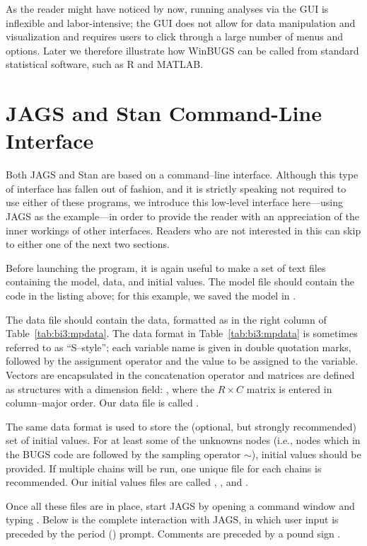 As the reader might have noticed by now, running analyses via the GUI is inflexible and labor-intensive; the GUI does not allow for data manipulation and visualization and requires users to click through a large number of menus and options. Later we therefore illustrate how WinBUGS can be called from standard statistical software, such as R and MATLAB.


\section{JAGS and Stan Command-Line Interface}
Both JAGS and Stan are based on a command--line interface. Although this type of interface has fallen out of fashion, and it is strictly speaking not required to use either of these programs, we introduce this low-level interface here---using JAGS as the example---in order to provide the reader with an appreciation of the inner workings of other interfaces. Readers who are not interested in this can skip to either one of the next two sections.

Before launching the program, it is again useful to make a set of text files containing the model, data, and initial values. The model file should contain the code in the listing above; for this example, we saved the model in . 

The data file should contain the data, formatted as in the right column of Table~\ref{tab:bi3:mpdata}. The data format in Table~\ref{tab:bi3:mpdata} is sometimes referred to as ``S--style''; each variable name is given in double quotation marks, followed by the assignment operator \code{<-} and the value to be assigned to the variable. Vectors are encapsulated in the concatenation operator  and matrices are defined as structures with a dimension field: , where the $R \times C$ matrix is entered in column--major order. Our data file is called .

The same data format is used to store the (optional, but strongly recommended) set of initial values. For at least some of the unknowns nodes (i.e., nodes which in the BUGS code are followed by the sampling operator $\sim$), initial values should be provided. If multiple chains will be run, one unique file for each chains is recommended. Our initial values files are called , , and .

Once all these files are in place, start JAGS by opening a command window and typing . Below is the complete interaction with JAGS, in which user input is preceded by the period () prompt. Comments are preceded by a pound sign \code{\#}.


